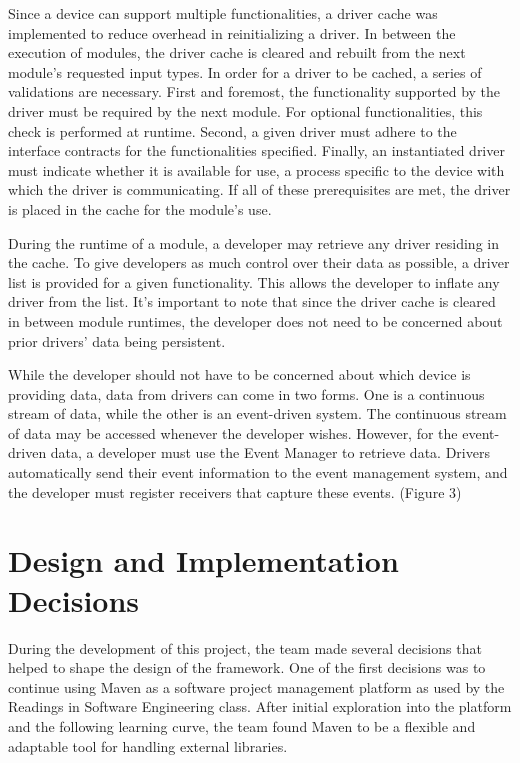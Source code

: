 \documentclass[11pt,letterpaper]{article}
\begin{document}
	Since a device can support multiple functionalities, a driver cache was 
	implemented to reduce overhead in reinitializing a driver. In between the 
	execution of modules, the driver cache is cleared and rebuilt from the 
	next module's requested input types. In order for a driver to be cached, a 
	series of validations are necessary. First and foremost, the functionality 
	supported by the driver must be required by the next module. For 
	optional functionalities, this check is performed at runtime. Second, a 
	given driver must adhere to the interface contracts for the 
	functionalities specified. Finally, an instantiated driver must indicate 
	whether it is available for use, a process specific to the device with 
	which the driver is communicating. If all of these prerequisites are met, 
	the driver is placed in the cache for the module's use. 

	During the runtime of a module, a developer may retrieve any driver 
	residing in the cache. To give developers as much control over their data 
	as possible, a driver list is provided for a given functionality. This 
	allows the developer to inflate any driver from the list. It's important 
	to note that since the driver cache is cleared in between module runtimes, 
	the developer does not need to be concerned about prior drivers' data 
	being persistent.

	While the developer should not have to be concerned about which device is 
	providing data, data from drivers can come in two forms. One is a 
	continuous stream of data, while the other is an event-driven system. The 
	continuous stream of data may be accessed whenever the developer wishes. 
	However, for the event-driven data, a developer must use the Event Manager 
	to retrieve data. Drivers automatically send their event information to 
	the event management system, and the developer must register receivers 
	that capture these events.
	(Figure 3)

	\pagebreak
   
	\section{Design and Implementation Decisions}

	During the development of this project, the team made several decisions that
	helped to shape the design of the framework. One of the first decisions was to
	continue using Maven as a software project management platform as used by the
	Readings in Software Engineering class. After initial exploration into the
	platform and the following learning curve, the team found Maven to be a
	flexible and adaptable tool for handling external libraries.
\end{document}
